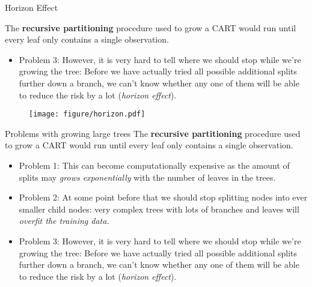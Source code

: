 \documentclass[11pt,compress,t,notes=noshow, xcolor=table]{beamer}
\begin{document}
\begin{vbframe}{Horizon Effect}

The \textbf{recursive partitioning} procedure used to grow a CART would run until every leaf only contains a single observation. 
\begin{itemize}
\item Problem 3: However, it is very hard to tell where we should stop while we're growing the tree: Before we have actually tried all possible additional splits further down a branch, we can't know whether any one of them will be able to reduce the risk by a lot (\emph{horizon effect}).
\end{itemize}

\begin{figure}
\centering
\texttt{[image: figure/horizon.pdf]}
\end{figure}


\end{vbframe}

\begin{vbframe}{Problems with growing large trees}
The \textbf{recursive partitioning} procedure used to grow a CART would run until every leaf only contains a single observation. 
\begin{itemize}
\item Problem 1: This can become computationally expensive as the amount of splits may \emph{grows exponentially} with the number of leaves in the trees.
\item Problem 2: At some point before that we should stop splitting nodes into ever smaller child nodes: very complex trees with lots of branches and leaves will \emph{overfit the training data.}
\item Problem 3: However, it is very hard to tell where we should stop while we're growing the tree: Before we have actually tried all possible additional splits further down a branch, we can't know whether any one of them will be able to reduce the risk by a lot (\emph{horizon effect}).
\end{itemize}
\end{vbframe}
\end{document}
